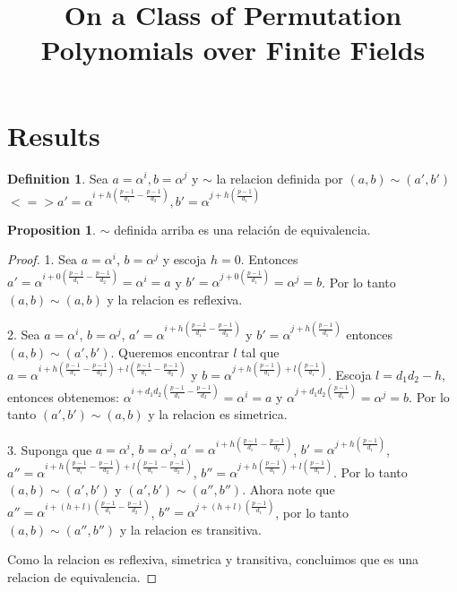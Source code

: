 \documentclass{article}
\theoremstyle{definition}
\newtheorem{definition}[theorem]{Definition}
\newtheorem{prop}[theorem]{Proposition}
\theoremstyle{remark}
\numberwithin{equation}{section}
\begin{document}
\title{On a Class of Permutation Polynomials over Finite Fields}


\maketitle

\begin{abstract}

\end{abstract}


\section{Results}

\begin{definition}

  Sea $a = \alpha^i, b = \alpha^j$ y $\sim$ la relacion definida por $(a,b) \sim (a', b')$ 
  $<=> a' = \alpha^{i+h(\frac{p-1}{d_1} - \frac{p-1}{d_2})}, b' = \alpha^{j+h(\frac{p-1}{d_1})}$

\end{definition}

\begin{prop}
  
  $\sim$ definida arriba es una relaci\'on de equivalencia.

\end{prop}

\begin{proof}
  
  1. Sea $a=\alpha^i$, $b=\alpha^j$ y escoja $h=0$. Entonces $a' = \alpha^{i+0(\frac{p-1}{d_1}-\frac{p-1}{d_2})} = \alpha^i = a$ y $b' = \alpha^{j+0(\frac{p-1}{d_1})} = \alpha^j = b$. Por lo tanto $(a,b) \sim (a,b)$ y la relacion es reflexiva.

  2. Sea $a = \alpha^i$, $b=\alpha^j$, $a' = \alpha^{i+h(\frac{p-1}{d_1}-\frac{p-1}{d_2})}$ y $b' = \alpha^{j+h(\frac{p-1}{d_1})}$ entonces $(a,b) \sim (a',b')$. Queremos encontrar $l$ tal que $a = \alpha^{i+h(\frac{p-1}{d_1}-\frac{p-1}{d_2})+l(\frac{p-1}{d_1}-\frac{p-1}{d_2})}$ y $b = \alpha^{j+h(\frac{p-1}{d_1})+l(\frac{p-1}{d_1})}$. Escoja $l=d_1d_2-h$, entonces obtenemos: $\alpha^{i+d_1d_2(\frac{p-1}{d_1}-\frac{p-1}{d_2})} = \alpha^i = a$ y $\alpha^{j+d_1d_2(\frac{p-1}{d_1})} = \alpha^j = b$. Por lo tanto $(a',b') \sim (a,b) $ y la relacion es simetrica.

  3. Suponga que $a = \alpha^i$, $b=\alpha^j$, $a' = \alpha^{i+h(\frac{p-1}{d_1}-\frac{p-1}{d_2})}$, $b' = \alpha^{j+h(\frac{p-1}{d_1})}$, $a'' = \alpha^{i+h(\frac{p-1}{d_1}-\frac{p-1}{d_2})+l(\frac{p-1}{d_1}-\frac{p-1}{d_2})}$, $b'' = \alpha^{j+h(\frac{p-1}{d_1})+l(\frac{p-1}{d_1})}$. Por lo tanto $(a,b) \sim (a',b')$ y $(a',b') \sim (a'',b'')$. Ahora note que $a'' = \alpha^{i+(h+l)(\frac{p-1}{d_1}-\frac{p-1}{d_2})}$, $b'' = \alpha^{j+(h+l)(\frac{p-1}{d_1})}$, por lo tanto $(a,b) \sim (a'',b'')$ y la relacion es transitiva.

  Como la relacion es reflexiva, simetrica y transitiva, concluimos que es una relacion de equivalencia.

\end{proof}
\end{document}
